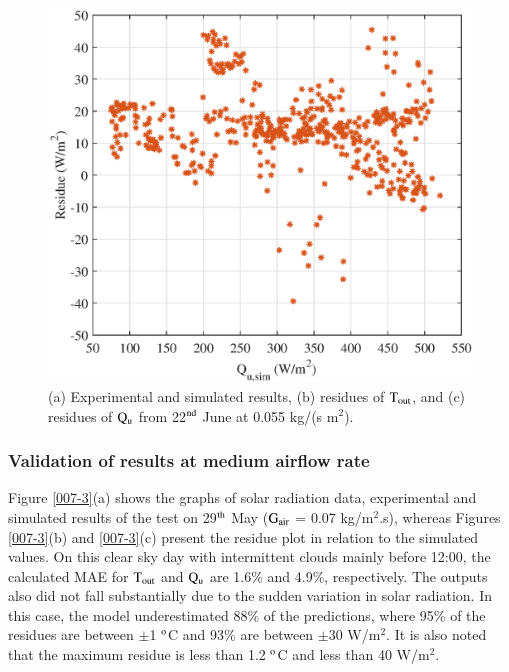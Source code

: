 \begin{figure}[ht!]
\begin{minipage}{0.39\columnwidth}
		\includegraphics[scale=0.5,width=1.0\columnwidth]{figs/0055-residue-6.eps}
	\end{minipage}
	
	\caption{(a) Experimental and simulated results, (b) residues of $\rm{T_{out}}$, and (c) residues of $\rm{Q_{u}}$ from 22$^{\rm{nd}}$ June at 0.055 kg/(s m$^2$).}
	\label{0055-3}
\end{figure}


\subsubsection{Validation of results at medium airflow rate}

Figure \ref{007-3}(a) shows the graphs of solar radiation data, experimental and simulated results of the test on 29$^{\rm{th}}$ May ($\rm{G_{air}}$ = 0.07 kg/m$^2$.s), whereas Figures \ref{007-3}(b) and \ref{007-3}(c) present the residue plot in relation to the simulated values. On this clear sky day with intermittent clouds mainly before 12:00, the calculated MAE for $\rm{T_{out}}$ and $\rm{Q_{u}}$ are 1.6\% and 4.9\%, respectively. The outputs also did not fall substantially due to the sudden variation in solar radiation. In this case, the model underestimated 88\% of the predictions, where 95\% of the residues are between $\pm$1 $^{\rm{o}}$C and 93\% are between $\pm$30 W/m$^2$. It is also noted that the maximum residue is less than 1.2 $^{\rm{o}}$C and less than 40 W/m$^2$. 


